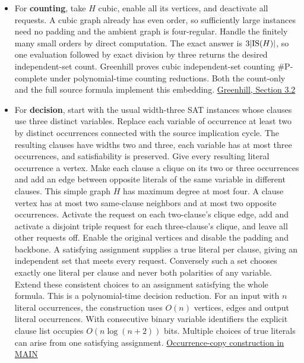 \documentclass[11pt,a4paper]{article}
\providecommand{\tightlist}{\setlength{\itemsep}{0pt}\setlength{\parskip}{0pt}}
\begin{document}
\begin{itemize}
\tightlist
\item
  For \textbf{counting}, take \(H\) cubic, enable all its vertices, and
  deactivate all requests. A cubic graph already has even order, so
  sufficiently large instances need no padding and the ambient graph is
  four-regular. Handle the finitely many small orders by direct
  computation. The exact answer is \(3|{\rm IS}(H)|\), so one evaluation
  followed by exact division by three returns the desired
  independent-set count. Greenhill proves cubic independent-set counting
  \(\#\mathrm P\)-complete under polynomial-time counting reductions.
  Both the count-only and the full source formula implement this
  embedding.
  \href{https://web.maths.unsw.edu.au/~csg/papers/complexity.pdf}{Greenhill,
  Section 3.2}
\item
  For \textbf{decision}, start with the usual width-three SAT instances
  whose clauses use three distinct variables. Replace each variable of
  occurrence at least two by distinct occurrences connected with the
  source implication cycle. The resulting clauses have widths two and
  three, each variable has at most three occurrences, and satisfiability
  is preserved. Give every resulting literal occurrence a vertex. Make
  each clause a clique on its two or three occurrences and add an edge
  between opposite literals of the same variable in different clauses.
  This simple graph \(H\) has maximum degree at most four. A clause
  vertex has at most two same-clause neighbors and at most two opposite
  occurrences. Activate the request on each two-clause's clique edge,
  add and activate a disjoint triple request for each three-clause's
  clique, and leave all other requests off. Enable the original vertices
  and disable the padding and backbone. A satisfying assignment supplies
  a true literal per clause, giving an independent set that meets every
  request. Conversely such a set chooses exactly one literal per clause
  and never both polarities of any variable. Extend these consistent
  choices to an assignment satisfying the whole formula. This is a
  polynomial-time decision reduction. For an input with \(n\) literal
  occurrences, the construction uses \(O(n)\) vertices, edges and output
  literal occurrences. With consecutive binary variable identifiers the
  explicit clause list occupies \(O(n\log(n+2))\) bits. Multiple choices of true
  literals can arise from one satisfying assignment.
  \href{https://github.com/openai/math/blob/main/preprints/The-Exponential-Time-Hypothesis-is-False-October-25-2026/build/main_full_version.tex\#L1465}{Occurrence-copy
  construction in MAIN}
\end{itemize}
\end{document}
